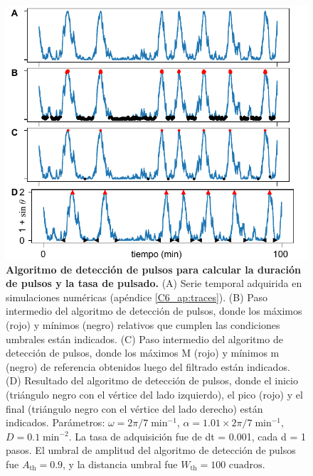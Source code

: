 \documentclass[./main.tex]{subfiles}
\begin{document}
 
 \begin{figure}
    \centering
    \includegraphics[width=1\columnwidth]{figures/chapter6/C6_pulse_detection.pdf} 
    \caption{\textbf{Algoritmo de detección de pulsos para calcular la duración de pulsos y la tasa de pulsado.} (A) Serie temporal adquirida en simulaciones numéricas (apéndice \ref{C6_ap:traces}). (B) Paso intermedio del algoritmo de detección de pulsos, donde los máximos (rojo) y mínimos (negro) relativos que cumplen las condiciones umbrales están indicados. (C)  Paso intermedio del algoritmo de detección de pulsos, donde los máximos M (rojo) y mínimos m (negro) de referencia obtenidos luego del filtrado están indicados. (D) Resultado del algoritmo de detección de pulsos, donde el inicio (triángulo negro con el vértice del lado izquierdo), el pico (rojo) y el final (triángulo negro con el vértice del lado derecho) están indicados. Parámetros: $\omega = 2\pi/ 7 \; \text{min}^{-1}$, $\alpha = 1.01 \times  2\pi/ 7 \; \text{min}^{-1}$, $ D = 0.1 \; \text{min}^{-2}$. La tasa de adquisición fue de dt = 0.001, cada d = 1 pasos. El umbral de amplitud del algoritmo de detección de pulsos fue $A_{\text{th}} = 0.9$, y la distancia umbral fue $W_{\text{th}} = 100\text{ cuadros}$.} 
    \label{C6_fig:pulse_detection}
\end{figure}
 
\end{document}
